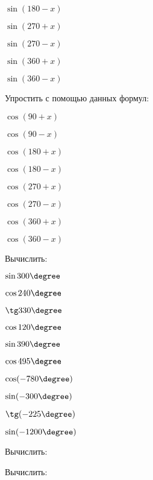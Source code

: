 \begin{class}[number=2]
\begin{listofex}
\begin{enumcols}[itemcolumns=4]
			\item \( \sin(180-x)\)
			\item \( \sin(270+x)\)
			\item \( \sin(270-x)\)
			\item \( \sin(360+x)\)
			\item \( \sin(360-x)\)
		\end{enumcols}
		\item Упростить с помощью данных формул:
		\begin{enumcols}[itemcolumns=4]
			\item \( \cos(90+x)\)
			\item \( \cos(90-x)\)
			\item \( \cos(180+x)\)
			\item \( \cos(180-x)\)
			\item \( \cos(270+x)\)
			\item \( \cos(270-x)\)
			\item \( \cos(360+x)\)
			\item \( \cos(360-x)\)
		\end{enumcols}
		\item Вычислить:
		\begin{enumcols}[itemcolumns=5]
			\item \( \sin 300\degree \)
			\item \( \cos 240\degree \)
			\item \( \tg 330\degree \)
			\item \( \cos 120\degree \)
			\item \( \sin 390\degree \)
			\item \( \cos 495\degree \)
			\item \( \cos (-780\degree) \)
			\item \( \sin (-300\degree) \)
			\item \( \tg (-225\degree) \)
			\item \( \sin (-1200\degree) \)
		\end{enumcols}
		\item Вычислить:
		\begin{enumcols}[itemcolumns=4]
			\item {}
			\item {}
			\item {}
			\item {}
		\end{enumcols}
		\item Вычислить:
		\begin{enumcols}[itemcolumns=2]

\end{enumcols}
\end{listofex}
\end{class}

